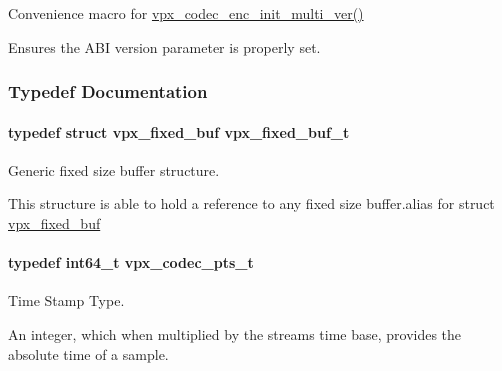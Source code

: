 Convenience macro for \hyperlink{group__encoder_ga1c0415984a5469687f53613a5471f53d}{vpx\+\_\+codec\+\_\+enc\+\_\+init\+\_\+multi\+\_\+ver()} 

Ensures the A\+BI version parameter is properly set. 

\subsubsection{Typedef Documentation}
\paragraph[{\texorpdfstring{vpx\+\_\+fixed\+\_\+buf\+\_\+t}{vpx_fixed_buf_t}}]{\setlength{\rightskip}{0pt plus 5cm}typedef struct {\bf vpx\+\_\+fixed\+\_\+buf}  {\bf vpx\+\_\+fixed\+\_\+buf\+\_\+t}}\hypertarget{group__encoder_ga21fab7dd28065f349c97165501223764}{}\label{group__encoder_ga21fab7dd28065f349c97165501223764}


Generic fixed size buffer structure. 

This structure is able to hold a reference to any fixed size buffer.\+alias for struct \hyperlink{structvpx__fixed__buf}{vpx\+\_\+fixed\+\_\+buf} 
\paragraph[{\texorpdfstring{vpx\+\_\+codec\+\_\+pts\+\_\+t}{vpx_codec_pts_t}}]{\setlength{\rightskip}{0pt plus 5cm}typedef int64\+\_\+t {\bf vpx\+\_\+codec\+\_\+pts\+\_\+t}}\hypertarget{group__encoder_ga7e711b0a71c65aef8f0faea8bd57b05f}{}\label{group__encoder_ga7e711b0a71c65aef8f0faea8bd57b05f}


Time Stamp Type. 

An integer, which when multiplied by the stream\textquotesingle{}s time base, provides the absolute time of a sample. 
